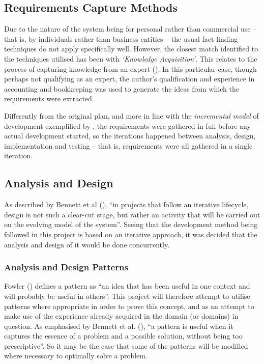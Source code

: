 \subsection{Requirements Capture Methods} \label{sec:DevelopmentMethod.RequirementsCapture}
Due to the nature of the system being for personal rather than commercial use
-- that is, by individuals rather than business entities -- the usual fact
finding techniques do not apply specifically well. However, the closest match
identified to the techniques utilised has been with \emph{`Knowledge
Acquisition'}. This relates to the process of capturing knowledge from an
expert (\cite[][p.~150]{bennett2010object}). In this particular case, though
perhaps not qualifying as an expert, the author's qualification and experience
in accounting and bookkeeping was used to generate the ideas from which the
requirements were extracted.

Differently from the original plan, and more in line with the \emph{incremental
model} of development exemplified by \cite[][pp.~120-124]{dawson2009projects},
the requirements were gathered in full before any actual development started,
so the iterations happened between analysis, design, implementation and testing
-- that is, requirements were all gathered in a single iteration.



\subsection{Analysis and Design} 
As described by Bennett et al (\citeyear[][p.~348]{bennett2010object}), ``in
projects that follow an iterative lifecycle, design is not such a clear-cut
stage, but rather an activity that will be carried out on the evolving model of
the system''. Seeing that the development method being followed in this project
is based on an iterative approach, it was decided that the analysis and design
of it would be done concurrently.

\subsubsection{Analysis and Design Patterns}
Fowler (\citeyear[][Section~1.3]{fowler1997analysis}) defines a pattern as ``an
idea that has been useful in one context and will probably be useful in
others''. This project will therefore attempt to utilise patterns where
appropriate in order to prove this concept, and as an attempt to make use of
the experience already acquired in the domain (or domains) in question. As
emphasised by Bennett et al. (\citeyear[][p.~252]{bennett2010object}), ``a
pattern is useful when it captures the essence of a problem and a possible
solution, without being too prescriptive''. So it may be the case that some of
the patterns will be modified where necessary to optimally solve a problem.

